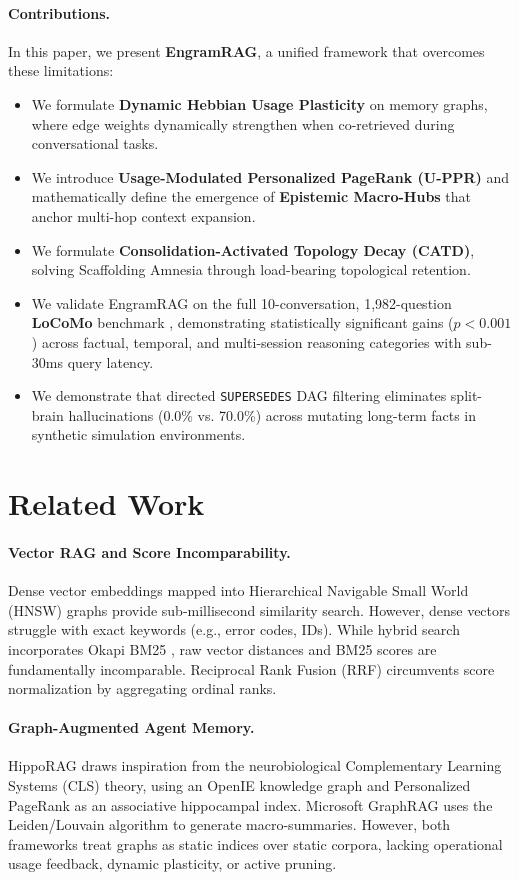 \documentclass[conference]{IEEEtran}
\begin{document}
\paragraph{Contributions.} In this paper, we present \textbf{EngramRAG}, a unified framework that overcomes these limitations:
\begin{itemize}
    \item We formulate \textbf{Dynamic Hebbian Usage Plasticity} on memory graphs, where edge weights dynamically strengthen when co-retrieved during conversational tasks.
    \item We introduce \textbf{Usage-Modulated Personalized PageRank (U-PPR)} and mathematically define the emergence of \textbf{Epistemic Macro-Hubs} that anchor multi-hop context expansion.
    \item We formulate \textbf{Consolidation-Activated Topology Decay (CATD)}, solving Scaffolding Amnesia through load-bearing topological retention.
    \item We validate EngramRAG on the full 10-conversation, 1,982-question \textbf{LoCoMo} benchmark \cite{maharana2024evaluating}, demonstrating statistically significant gains ($p < 0.001$) across factual, temporal, and multi-session reasoning categories with sub-30ms query latency.
    \item We demonstrate that directed \texttt{SUPERSEDES} DAG filtering eliminates split-brain hallucinations (0.0\% vs. 70.0\%) across mutating long-term facts in synthetic simulation environments.
\end{itemize}

\section{Related Work}

\paragraph{Vector RAG and Score Incomparability.} Dense vector embeddings mapped into Hierarchical Navigable Small World (HNSW) graphs \cite{malkov2018hnsw} provide sub-millisecond similarity search. However, dense vectors struggle with exact keywords (e.g., error codes, IDs). While hybrid search incorporates Okapi BM25 \cite{robertson2009bm25}, raw vector distances and BM25 scores are fundamentally incomparable. Reciprocal Rank Fusion (RRF) \cite{cormack2009rrf} circumvents score normalization by aggregating ordinal ranks.

\paragraph{Graph-Augmented Agent Memory.} HippoRAG \cite{gutierrez2024hipporag} draws inspiration from the neurobiological Complementary Learning Systems (CLS) theory, using an OpenIE knowledge graph and Personalized PageRank \cite{page1999pagerank} as an associative hippocampal index. Microsoft GraphRAG \cite{edge2024graphrag} uses the Leiden/Louvain algorithm \cite{blondel2008louvain} to generate macro-summaries. However, both frameworks treat graphs as static indices over static corpora, lacking operational usage feedback, dynamic plasticity, or active pruning.
\end{document}
